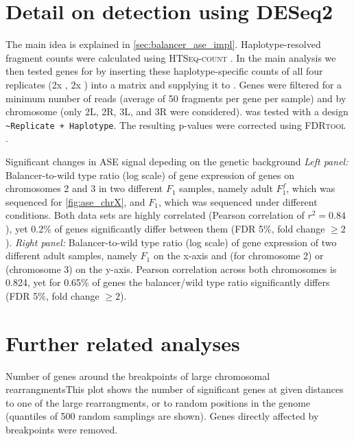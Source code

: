 \section{Detail on \texorpdfstring{\ase}{ASE} detection using DESeq2}
\label{sec:suppl_deseq}
The main idea is explained in \cref{sec:balancer_ase_impl}. Haplotype-resolved
fragment counts were calculated using \textsc{HTSeq-count} \citep{Anders2015}.
In the main analysis we then tested genes for \ase by inserting these
haplotype-specific counts of all four replicates (2x \Nmat, 2x \Npat) into a
matrix and supplying it to \deseq. Genes were filtered for a minimum number of
reads (average of 50 fragments per gene per sample) and by chromosome (only 2L,
2R, 3L, and 3R were considered). \deseq was tested with a design
\texttt{\footnotesize \textasciitilde Replicate + Haplotype}. The resulting
p-values were corrected using \textsc{FDRtool} \citep{Strimmer2008}.



    {Significant changes in ASE signal depeding on the genetic background}{
    \textit{Left panel:} Balancer-to-wild type ratio (log scale) of gene
    expression of genes on chromosomes 2 and 3 in two different $F_1$ samples,
    namely adult $F_1^f$, which was sequenced for \cref{fig:ase_chrX}, and $F_1$,
    which was sequenced under different conditions. Both data sets are highly
    correlated (Pearson correlation of $r^2 = 0.84$), yet 0.2\% of genes significantly differ
    between them (FDR 5\%, fold change $\geq 2$).
    \textit{Right panel:} Balancer-to-wild type ratio (log scale) of gene expression
    of two different adult samples, namely $F_1$ on the x-axis and \Fcyo (for
    chromosome 2) or \Ftm (chromosome 3) on the y-axis. Pearson correlation
    across both chromosomes is 0.824, yet for 0.65\% of genes the balancer/wild
    type ratio significantly differs (FDR 5\%, fold change $\geq 2$).}


\section{Further \texorpdfstring{\ase}{ASE} related analyses}
\label{sec:suppl_ase_more}

    {Number of \texorpdfstring{\ase}{ASE} genes around the breakpoints of large
    chromosomal rearrangments}{This plot shows the number of significant \ase
    genes at given distances to one of the large rearrangments, or to random
    positions in the genome (quantiles of 500 random samplings are shown).
    Genes directly affected by breakpoints were removed.}






